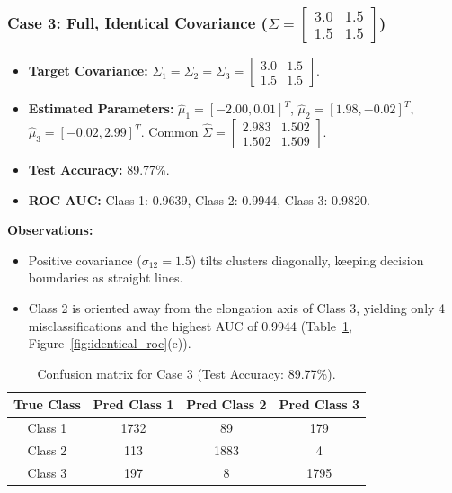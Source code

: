 \documentclass[11pt,a4paper]{article}
\begin{document}
\subsubsection{Case 3: Full, Identical Covariance ($\Sigma=\begin{bmatrix}3.0&1.5\\1.5&1.5\end{bmatrix}$)}
\begin{itemize}
  \item \textbf{Target Covariance:} $\Sigma_1=\Sigma_2=\Sigma_3=\begin{bmatrix}3.0&1.5\\1.5&1.5\end{bmatrix}$.
  \item \textbf{Estimated Parameters:} $\hat{\mu}_1=[-2.00,0.01]^T$, $\hat{\mu}_2=[1.98,-0.02]^T$, $\hat{\mu}_3=[-0.02,2.99]^T$. Common $\hat{\Sigma}=\begin{bmatrix}2.983&1.502\\1.502&1.509\end{bmatrix}$.
  \item \textbf{Test Accuracy:} 89.77\%.
  \item \textbf{ROC AUC:} Class 1: 0.9639, Class 2: 0.9944, Class 3: 0.9820.
\end{itemize}
\textbf{Observations:}
\begin{itemize}
  \item Positive covariance ($\sigma_{12}=1.5$) tilts clusters diagonally, keeping decision boundaries as straight lines.
  \item Class 2 is oriented away from the elongation axis of Class 3, yielding only 4 misclassifications and the highest AUC of 0.9944 (Table~\ref{tab:c3}, Figure~\ref{fig:identical_roc}(c)).
\end{itemize}

\begin{table}[ht]
\centering
\begin{tabular}{cccc}
\toprule
\textbf{True Class} & \textbf{Pred Class 1} & \textbf{Pred Class 2} & \textbf{Pred Class 3}\\
\midrule
Class 1 & 1732 & 89 & 179\\
Class 2 & 113 & 1883 & 4\\
Class 3 & 197 & 8 & 1795\\
\bottomrule
\end{tabular}
\caption{Confusion matrix for Case 3 (Test Accuracy: 89.77\%).}
\label{tab:c3}
\end{table}
\end{document}
